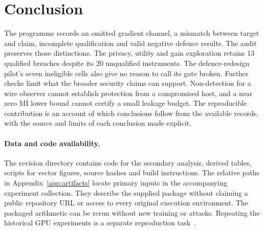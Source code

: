 \section{Conclusion}

The programme records an omitted gradient channel, a mismatch between
target and claim, incomplete qualification and valid negative defence
results. The audit preserves those distinctions. The privacy, utility and
gain exploration retains 13 qualified breaches despite its 20 unqualified
instruments. The defence-redesign pilot's seven ineligible cells also give
no reason to call its gate broken. Further checks limit what the
broader security claims can support. Non-detection for a wire observer
cannot establish protection from a compromised host, and a near zero MI
lower bound cannot certify a small leakage budget. The reproducible
contribution is an account of which conclusions follow from the available
records, with the source and limits of each conclusion made explicit.

\paragraph{Data and code availability.}
The revision directory contains code for the secondary analysis, derived
tables, scripts for vector figures, source hashes and build instructions.
The relative paths in Appendix~\ref{app:artifacts} locate primary inputs
in the accompanying experiment collection. They describe the supplied
package without claiming a public repository URL or access to every
original execution environment. The packaged arithmetic can be rerun
without new training or attacks. Repeating the historical GPU experiments
is a separate reproduction task~\citep{artifacts2026}.
